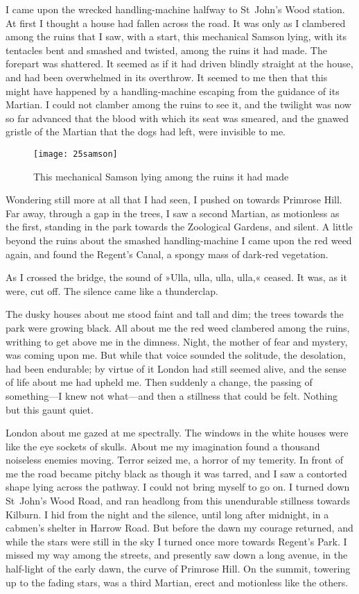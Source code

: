 I came upon the wrecked handling-machine halfway to St~John's Wood station. At first I thought a house had fallen across the road. It was only as I clambered among the ruins that I saw, with a start, this mechanical Samson lying, with its tentacles bent and smashed and twisted, among the ruins it had made. The forepart was shattered. It seemed as if it had driven blindly straight at the house, and had been overwhelmed in its overthrow. It seemed to me then that this might have happened by a handling-machine escaping from the guidance of its Martian. I could not clamber among the ruins to see it, and the twilight was now so far advanced that the blood with which its seat was smeared, and the gnawed gristle of the Martian that the dogs had left, were invisible to me.

\begin{figure}[p]
\centering
\texttt{[image: 25samson]}
\caption{This mechanical Samson lying among the ruins it had made}
\end{figure}

Wondering still more at all that I had seen, I pushed on towards Primrose Hill. Far away, through a gap in the trees, I saw a second Martian, as motionless as the first, standing in the park towards the Zoological Gardens, and silent. A little beyond the ruins about the smashed handling-machine I came upon the red weed again, and found the Regent's Canal, a spongy mass of dark-red vegetation.

As I crossed the bridge, the sound of »Ulla, ulla, ulla, ulla,« ceased. It was, as it were, cut off. The silence came like a thunderclap.

The dusky houses about me stood faint and tall and dim; the trees towards the park were growing black. All about me the red weed clambered among the ruins, writhing to get above me in the dimness. Night, the mother of fear and mystery, was coming upon me. But while that voice sounded the solitude, the desolation, had been endurable; by virtue of it London had still seemed alive, and the sense of life about me had upheld me. Then suddenly a change, the passing of something—I knew not what—and then a stillness that could be felt. Nothing but this gaunt quiet.

London about me gazed at me spectrally. The windows in the white houses were like the eye sockets of skulls. About me my imagination found a thousand noiseless enemies moving. Terror seized me, a horror of my temerity. In front of me the road became pitchy black as though it was tarred, and I saw a contorted shape lying across the pathway. I could not bring myself to go on. I turned down St~John's Wood Road, and ran headlong from this unendurable stillness towards Kilburn. I hid from the night and the silence, until long after midnight, in a cabmen's shelter in Harrow Road. But before the dawn my courage returned, and while the stars were still in the sky I turned once more towards Regent's Park. I missed my way among the streets, and presently saw down a long avenue, in the half-light of the early dawn, the curve of Primrose Hill. On the summit, towering up to the fading stars, was a third Martian, erect and motionless like the others.

